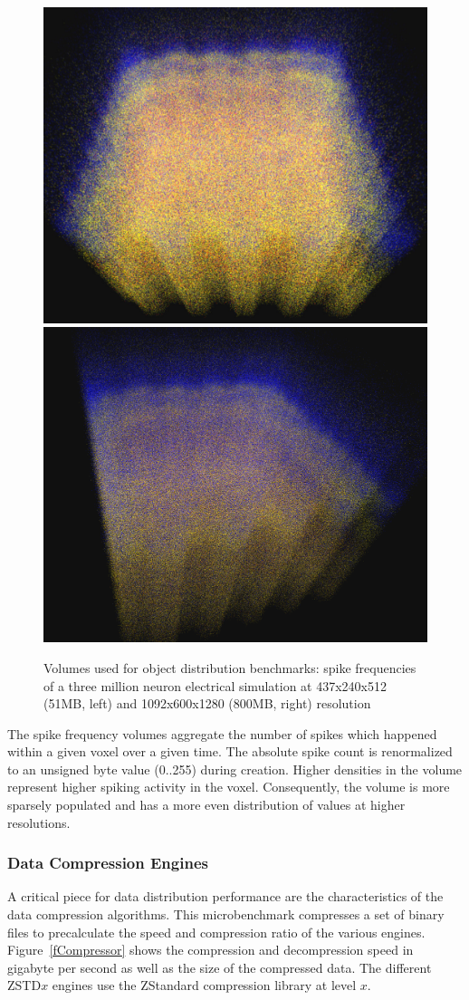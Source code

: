 \documentclass[10pt,journal,compsoc]{IEEEtran}
\newcommand{\fig}[1]{Figure~\ref{#1}}
\begin{document}
\begin{figure}[ht]\center
  \includegraphics[width=.49\columnwidth]{images/spikes512}\hfil
  \includegraphics[width=.49\columnwidth]{images/spikes1280}
  \caption{\label{fVolumes}Volumes used for object distribution benchmarks:
    spike frequencies of a three million neuron electrical simulation at
    437x240x512 (51MB, left) and 1092x600x1280 (800MB, right) resolution}
\end{figure}

The spike frequency volumes aggregate the number of spikes which happened within
a given voxel over a given time. The absolute spike count is renormalized to an
unsigned byte value (0..255) during creation. Higher densities in the volume
represent higher spiking activity in the voxel. Consequently, the volume is more
sparsely populated and has a more even distribution of values at higher
resolutions.

\subsubsection{Data Compression Engines}

A critical piece for data distribution performance are the characteristics of
the data compression algorithms. This microbenchmark compresses a set of binary
files to precalculate the speed and compression ratio of the various
engines. \fig{fCompressor} shows the compression and decompression speed in
gigabyte per second as well as the size of the compressed data. The different
ZSTD$x$ engines use the ZStandard compression library at level $x$.
\end{document}
